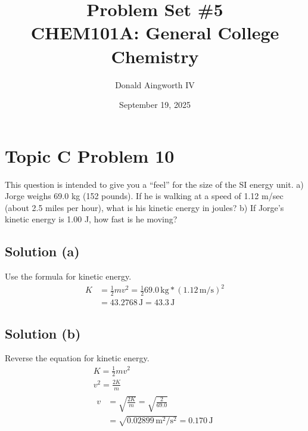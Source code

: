 \documentclass[10pt]{article}
\title{
    Problem Set \#5
    \\  \small
    CHEM101A: General College Chemistry
    }
\author{Donald Aingworth IV}
\date{September 19, 2025}
\begin{document}

    \maketitle

    \setcounter{section}{9}

    \pagebreak
    \section{Topic C Problem 10}
        This question is intended to give you a “feel” for the size of the SI energy unit.
        a) Jorge weighs 69.0 kg (152 pounds). If he is walking at a speed of 1.12 m/sec (about 2.5 miles per hour), what is his kinetic energy in joules? 
        b) If Jorge's kinetic energy is 1.00 J, how fast is he moving?

        \subsection{Solution (a)}
            Use the formula for kinetic energy.
            \begin{align}
                K   &=  \frac{1}{2}mv^2
                    =   \frac{1}{2}69.0\,\unit{\kilo\gram} * \left( 1.12\,\unit{\meter/\second} \right)^2\\
                    &=  43.2768\,\unit{\joule}
                    =   \boxed{43.3\,\unit{\joule}}
            \end{align}

        \subsection{Solution (b)}
            Reverse the equation for kinetic energy.
            \begin{gather}
                K   =   \frac{1}{2}mv^2\\
                v^2 =   \frac{2K}{m}\\
                \begin{align}
                    v   &=  \sqrt{\frac{2K}{m}}
                        =   \sqrt{\frac{2}{69.0}}\\
                        &=  \sqrt{0.02899\,\unit{\meter^2/\second^2}}
                        =   \boxed{0.170\,\unit{\joule}}
                \end{align}
            \end{gather}
\end{document}
